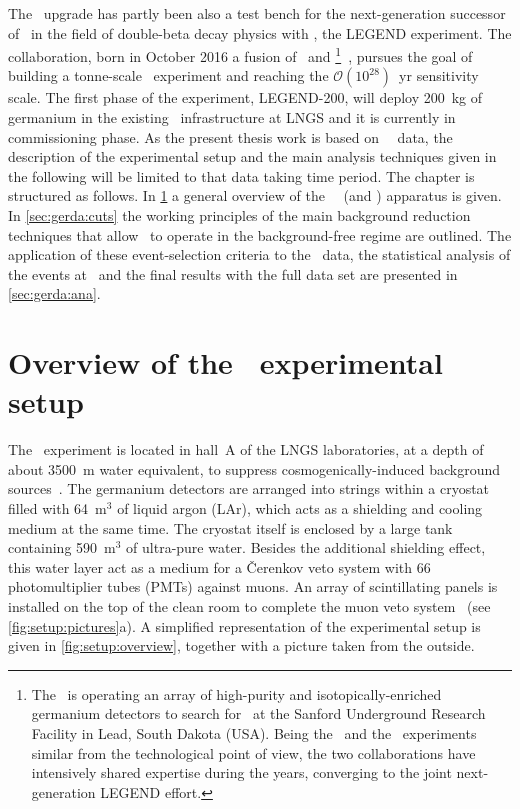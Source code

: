 \newpar
The \phasetwop\ upgrade has partly been also a test bench for the next-generation successor of
\gerda\ in the field of double-beta decay physics with \gesix, the LEGEND experiment. The
collaboration, born in October 2016 a fusion of \gerda\ and
\majorana\footnote{%
  The \majoranademo\ is operating an array of high-purity and isotopically-enriched
  germanium detectors to search for \onbb\ at the Sanford Underground Research Facility
  in Lead, South Dakota (USA). Being the \majoranademo\ and the \gerda\ experiments
  similar from the technological point of view, the two collaborations have intensively
  shared expertise during the years, converging to the joint next-generation LEGEND effort.
}~\cite{Abgrall2014}, pursues the goal of building a tonne-scale \gesix\ experiment and
reaching the $\mathcal{O}(10^{28})$~yr sensitivity scale. The first phase of the
experiment, LEGEND-200, will deploy 200~kg of germanium in the existing \gerda\
infrastructure at LNGS and it is currently in commissioning phase.
\newpar
As the present thesis work is based on \gerda\ \phasetwo\ data, the description of the
experimental setup and the main analysis techniques given in the following will be limited
to that data taking time period. The chapter is structured as follows. In
\cref{sec:gerda:setup} a general overview of the \gerda\ \phasetwo\ (and \phasetwop)
apparatus is given. In \cref{sec:gerda:cuts} the working principles of the main background
reduction techniques that allow \gerda\ to operate in the background-free regime are
outlined. The application of these event-selection criteria to the \phasetwo\ data, the
statistical analysis of the events at \qbb\ and the final results with the full data set
are presented in \cref{sec:gerda:ana}.

\section{Overview of the \phasetwo\ experimental setup}%
\label{sec:gerda:setup}

The \gerda\ experiment is located in hall~A of the LNGS laboratories, at a depth of about
3500~m water equivalent, to suppress cosmogenically-induced background
sources~\cite{Wiesinger2018}. The germanium detectors are arranged into strings within a
cryostat filled with 64~m$^3$ of liquid argon (LAr), which acts as a shielding and cooling
medium at the same time. The cryostat itself is enclosed by a large tank containing
590~m$^3$ of ultra-pure water.  Besides the additional shielding effect, this water layer
act as a medium for a \v{C}erenkov veto system with 66 photomultiplier tubes (PMTs)
against muons. An array of scintillating panels is installed on the top of the clean room
to complete the muon veto system~\cite{Freund2016} (see \cref{fig:setup:pictures}a). A
simplified representation of the experimental setup is given in \cref{fig:setup:overview},
together with a picture taken from the outside.

